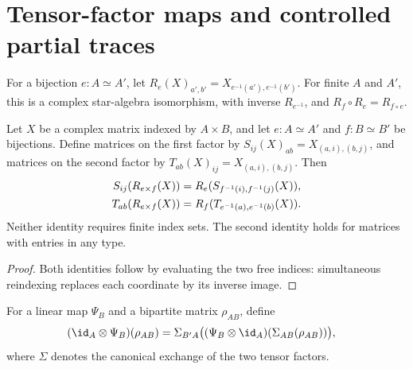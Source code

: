\section{Tensor-factor maps and controlled partial traces}

\begin{definition}
    \label{def:matrix_reindex_star_equiv}
    \leanok
    For a bijection $e:A\simeq A'$, let
    $R_e(X)_{a',b'}=X_{e^{-1}(a'),e^{-1}(b')}$.
    For finite $A$ and $A'$, this is a complex star-algebra isomorphism,
    with inverse $R_{e^{-1}}$,
    and $R_f\circ R_e=R_{f\circ e}$.
\end{definition}

\begin{theorem}
    \label{thm:bipartite_coefficients_reindex}
    \leanok
    Let $X$ be a complex matrix indexed by $A\times B$, and let
    $e:A\simeq A'$ and $f:B\simeq B'$ be bijections. Define matrices on the
    first factor by $S_{ij}(X)_{ab}=X_{(a,i),(b,j)}$, and matrices on the
    second factor by $T_{ab}(X)_{ij}=X_{(a,i),(b,j)}$. Then
    \begin{align}
        S_{ij}(R_{e\times f}(X))
         & =R_e(S_{f^{-1}(i),f^{-1}(j)}(X)), \notag \\
        T_{ab}(R_{e\times f}(X))
         & =R_f(T_{e^{-1}(a),e^{-1}(b)}(X)). \notag
    \end{align}
    Neither identity requires finite index sets. The second identity holds
    for matrices with entries in any type.
\end{theorem}

\begin{proof}\leanok
    Both identities follow by evaluating the two free indices: simultaneous
    reindexing replaces each coordinate by its inverse image.
\end{proof}

\begin{definition}
    \label{def:id_tensor_map}
    \leanok
    For a linear map $\Psi_B$ and a bipartite matrix $\rho_{AB}$, define
    \begin{align}
        (\id_A\otimes\Psi_B)(\rho_{AB})
         & =\Sigma_{B'A}\bigl((\Psi_B\otimes\id_A)
        (\Sigma_{AB}(\rho_{AB}))\bigr),
        \notag
    \end{align}
    where $\Sigma$ denotes the canonical exchange of the two tensor factors.
\end{definition}

